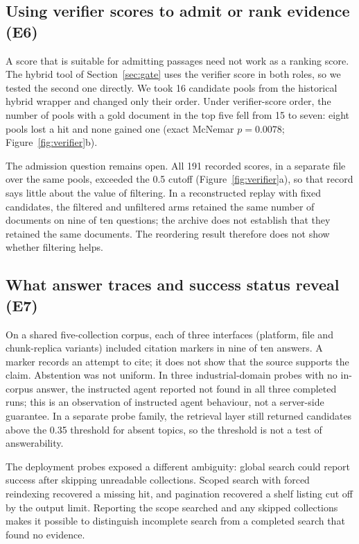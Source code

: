 \subsection{Using verifier scores to admit or rank evidence (E6)}
\label{sec:e6}
\label{sec:inflation}\label{sec:eval-verify}\label{sec:exp-e6}
A score that is suitable for admitting passages need not work as a ranking
score. The hybrid tool of Section~\ref{sec:gate} uses the verifier score in
both roles, so we tested the second one directly. We took 16 candidate pools
from the historical hybrid wrapper and changed only their order. Under
verifier-score order, the number of pools with a gold document in the top
five fell from 15 to seven: eight pools lost a hit and none gained one
(exact McNemar $p=0.0078$; Figure~\ref{fig:verifier}b).

The admission question remains open. All 191 recorded scores, in a separate
file over the same pools, exceeded the 0.5 cutoff
(Figure~\ref{fig:verifier}a), so that record says little about the value of
filtering. In a reconstructed replay with fixed
candidates, the filtered and unfiltered arms retained the same number of
documents on nine of ten questions; the archive does not establish that they
retained the same documents. The reordering result therefore does not show
whether filtering helps.

\subsection{What answer traces and success status reveal (E7)}
\label{sec:e5}
\label{sec:agentic}\label{sec:abstention}\label{sec:composition}\label{sec:eval-agent}
\label{sec:sysarms}\label{sec:e7}\label{sec:exp-e7}
On a shared five-collection corpus, each of three interfaces (platform, file
and chunk-replica variants) included citation markers in nine of ten answers. A marker records an attempt to
cite; it does not show that the source supports the claim. Abstention was
not uniform. In three industrial-domain probes with no in-corpus answer, the
instructed agent reported not found in all three completed runs; this is an
observation of instructed agent behaviour, not a server-side guarantee. In a
separate probe family, the retrieval layer still returned candidates above
the 0.35 threshold for absent topics, so the threshold is not a test of
answerability.

The deployment probes exposed a different ambiguity: global search could
report success after skipping unreadable collections. Scoped search with
forced reindexing recovered a missing hit, and pagination recovered a shelf
listing cut off by the output limit. Reporting the scope searched and any
skipped collections makes it possible to distinguish incomplete search from
a completed search that found no evidence.

